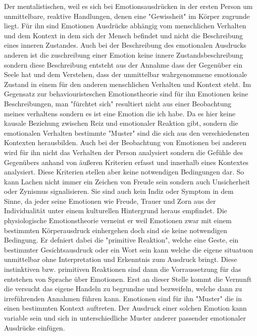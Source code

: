Der mentalistischen, weil es sich bei Emotionsausdrücken in der ersten Person um unmittelbare, reaktive Handlungen, denen eine "Gewissheit" im Körper zugrunde liegt. Für ihn sind Emotionen Ausdrücke abhängig vom menschlichen Verhalten und dem Kontext in dem sich der Mensch befindet und nicht die Beschreibung eines inneren Zustandes. Auch bei der Beschreibung des emotionalen Ausdrucks anderen ist die zuschreibung einer Emotion keine innere Zustandsbeschreibung sondern diese Beschreibung entsteht aus der Annahme dass der Gegenüber ein Seele hat und dem Verstehen, dass der unmittelbar wahrgenommene emotionale Zustand in einem für den anderen menschlichen Verhalten und Kontext steht. Im Gegensatz zur behaviouristeschen Emotionstheorie sind für ihn Emotionen keine Beschreibungen, man "fürchtet sich" resultiert nicht aus einer Beobachtung meines verhaltens sondern es ist eine Emotion die ich habe. Da es hier keine kausale Beziehung zwischen Reiz und emotionaler Reaktion gibt, sondern die emotionalen Verhalten bestimmte "Muster" sind die sich aus den verschiedensten Kontexten herausbilden. Auch bei der Beobachtung von Emotionen bei anderen wird für ihn nicht das Verhalten der Person analysiert sondern die Gefühle des Gegenübers anhand von äußeren Kriterien erfasst und innerhalb eines Kontextes analysiert. Diese Kriterien stellen aber keine notwendigen Bedingungen dar. So kann Lachen nicht immer ein  Zeichen von Freude sein sondern auch Unsicherheit oder Zynismus signalisieren. Sie sind auch kein Indiz oder Symptom in dem Sinne, da jeder seine Emotionen wie Freude, Trauer und Zorn aus der Individualität unter einem kulturellen Hintergrund heraus empfindet. Die physiologische Emotionstheorie verneint er weil Emotionen zwar mit einem bestimmten Körperausdruck einhergehen doch sind sie keine notwendigen Bedingung. Er defniert dabei die "primitive Reaktion", welche eine Geste, ein bestimmter Gesichtsausdruck oder ein Wort sein kann welche die eigene situatuon unmittelbar ohne Interpretation und Erkenntnis zum Ausdruck bringt. Diese instinktiven bzw. primitiven Reaktionen sind dann die Vorraussetzung für das entstehen von Sprache über Emotionen. Erst an dieser Stelle kommt die Vernunft die versucht das eigene Handeln zu begrundne und bezweifeln, welche dann zu irreführenden Annahmen führen kann. Emotionen sind für ihn "Muster" die in einen bestimmten Kontext auftreten. Der Ausdruck einer solchen Emotion kann variable sein und sich in unterschiedliche Muster anderer passender emotionaler Ausdrücke einfügen. \cite{gunter_gebauer_wittgenstein:_2008}\\


